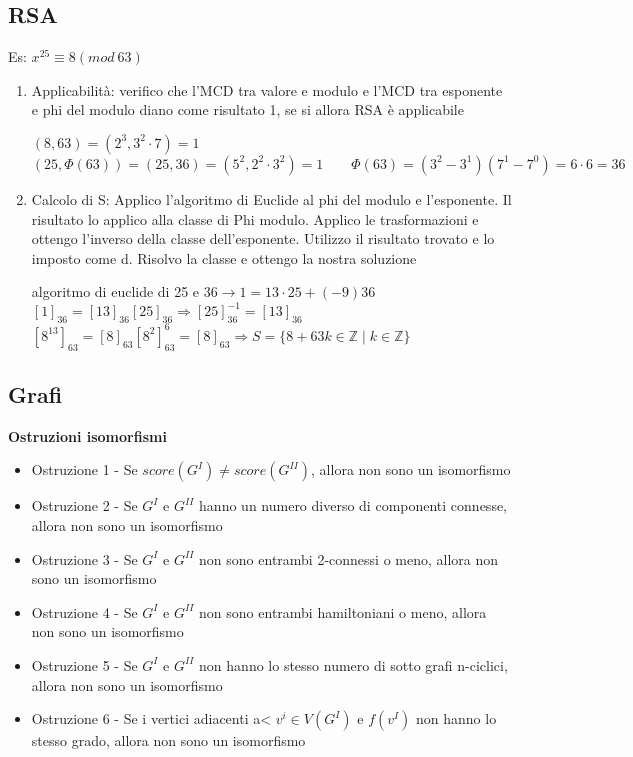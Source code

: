 \documentclass[12pt, a4paper]{article}
\begin{document}
\subsection{RSA}
Es: $x^{25}\equiv 8(mod\ 63)$
\begin{enumerate}
    \item Applicabilità: verifico che l'MCD tra valore e modulo e l'MCD tra esponente e phi del modulo 
    diano come risultato 1, se si allora RSA è applicabile
    \begin{center}
        $(8,63)=(2^{3},3^{2}\cdot 7)=1$\\
        $(25,\Phi(63))=(25,36)=(5^{2},2^{2}\cdot 3^{2})=1\qquad \Phi(63)=(3^{2}-3^{1})(7^{1}-7^{0})
        =6\cdot 6=36$
    \end{center}
    \item Calcolo di S: Applico l'algoritmo di Euclide al phi del modulo e l'esponente. Il risultato lo applico
    alla classe di Phi modulo. Applico le trasformazioni e ottengo l'inverso della classe dell'esponente.
    Utilizzo il risultato trovato e lo imposto come d. Risolvo la classe e ottengo la nostra soluzione
    \begin{center}
        algoritmo di euclide di 25 e 36$\rightarrow 1=13\cdot25+(-9)36$\\
        $[1]_{36}=[13]_{36}[25]_{36}\Rightarrow [25]^{-1}_{36}=[13]_{36}$\\
        $[8^{13}]_{63}=[8]_{63}[8^{2}]^{6}_{63}=[8]_{63}\Rightarrow S=\{8+63k\in\mathbb{Z}\mid 
        k\in\mathbb{Z}\}$
    \end{center}
\end{enumerate}
\subsection{Grafi}
\textbf{Ostruzioni isomorfismi}
\begin{itemize}
    \item Ostruzione 1 - Se  $score(G^{I})\neq score(G^{II})$, allora non sono un isomorfismo
    \item Ostruzione 2 - Se $G^{I}$ e $G^{II}$ hanno un numero diverso di componenti connesse, allora non sono
    un isomorfismo
    \item Ostruzione 3 - Se $G^{I}$ e $G^{II}$ non sono entrambi 2-connessi o meno, allora non sono un isomorfismo  
    \item Ostruzione 4 - Se $G^{I}$ e $G^{II}$ non sono entrambi hamiltoniani o meno, allora non sono un 
    isomorfismo
    \item Ostruzione 5 - Se $G^{I}$ e $G^{II}$ non hanno lo stesso numero di sotto grafi n-ciclici, allora non sono
     un isomorfismo
    \item Ostruzione 6 - Se i vertici adiacenti a< $v^{i}\in V(G^{I})$ e $f(v^{I})$ non hanno lo stesso grado, 
    allora non sono un isomorfismo
\end{itemize}
\end{document}
